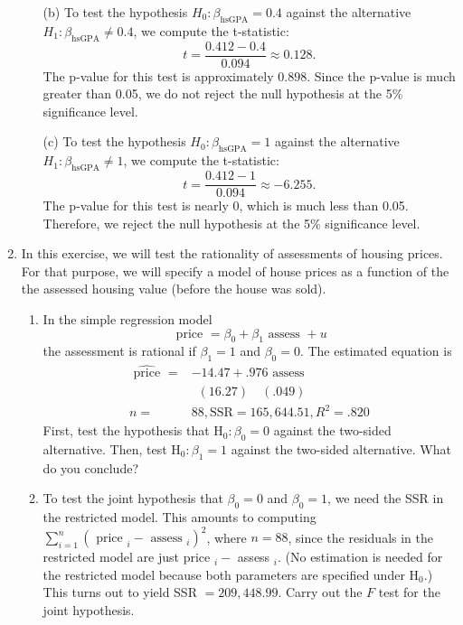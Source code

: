\documentclass[12pt]{article}
\begin{document}
\begin{enumerate}
{\begin{enumerate}
    \item[(b)] To test the hypothesis \( H_0: \beta_{\text{hsGPA}} = 0.4 \) against the alternative \( H_1: \beta_{\text{hsGPA}} \neq 0.4 \), we compute the t-statistic:
    \[
    t = \frac{0.412 - 0.4}{0.094} \approx 0.128.
    \]
    The p-value for this test is approximately \( 0.898 \). Since the p-value is much greater than 0.05, we do not reject the null hypothesis at the 5\% significance level.

    \item[(c)] To test the hypothesis \( H_0: \beta_{\text{hsGPA}} = 1 \) against the alternative \( H_1: \beta_{\text{hsGPA}} \neq 1 \), we compute the t-statistic:
    \[
    t = \frac{0.412 - 1}{0.094} \approx -6.255.
    \]
    The p-value for this test is nearly 0, which is much less than 0.05. Therefore, we reject the null hypothesis at the 5\% significance level.
\end{enumerate}
}



\item In this exercise, we will test the rationality of assessments of housing prices. For that purpose, we will specify a model of house prices as a function of the the assessed housing value (before the house was sold).

\begin{enumerate}
    \item In the simple regression model
$$
\text { price }=\beta_0+\beta_1 \text { assess }+u
$$
the assessment is rational if $\beta_1=1$ and $\beta_0=0$. The estimated equation is
$$
\begin{aligned}
\widehat{\text { price }}= & -14.47+.976 \text { assess } \\
& \,\,\,(16.27) \quad(.049) \\
n= & 88, \mathrm{SSR}=165,644.51, R^2=.820
\end{aligned}
$$
First, test the hypothesis that $\mathrm{H}_0: \beta_0=0$ against the two-sided alternative. Then, test $\mathrm{H}_0: \beta_1=1$ against the two-sided alternative. What do you conclude?

\item  To test the joint hypothesis that $\beta_0=0$ and $\beta_0=1$, we need the SSR in the restricted model. This amounts to computing $\sum_{i=1}^n\left(\text { price }_i-\text { assess }_i\right)^2$, where $n=88$, since the residuals in the restricted model are just price ${ }_i-$ assess $_i$. (No estimation is needed for the restricted model because both parameters are specified under $\mathrm{H}_0$.) This turns out to yield SSR $=209,448.99$. Carry out the $F$ test for the joint hypothesis.


\end{enumerate}
\end{enumerate}
\end{document}
